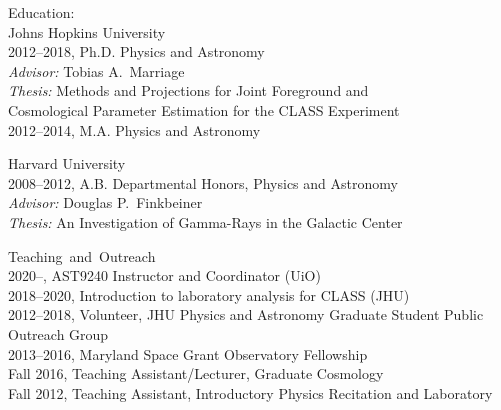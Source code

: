 \documentclass[a4paper]{resume}
\begin{document}
\begin{category}{Education:}
\citemnobullet\\
Johns Hopkins University \\
2012--2018, Ph.D. Physics and Astronomy\\
\qquad \textsl{Advisor:} Tobias A.~Marriage\\
\qquad \textsl{Thesis:} Methods and Projections for Joint Foreground
and\\
\qquad {} Cosmological Parameter Estimation
for the CLASS Experiment\\
2012--2014, M.A. Physics and Astronomy 

\citemnobullet
Harvard University\\
2008--2012, A.B. Departmental Honors, Physics and Astronomy\\
\qquad \textsl{Advisor:} Douglas P.~Finkbeiner\\
\qquad \textsl{Thesis:} An Investigation of Gamma-Rays in the Galactic
Center
\end{category}




\begin{category}{\mbox{Teaching and Outreach}}
  \citemnobullet\\
2020--, AST9240 Instructor and Coordinator (UiO)\\
2018--2020, Introduction to laboratory analysis for CLASS (JHU)\\
2012--2018, Volunteer, JHU Physics and Astronomy Graduate Student Public Outreach Group\\
2013--2016, Maryland Space Grant Observatory Fellowship\\
Fall 2016, Teaching Assistant/Lecturer, Graduate Cosmology\\
Fall 2012, Teaching Assistant, Introductory Physics Recitation and Laboratory
\end{category}
\end{document}
